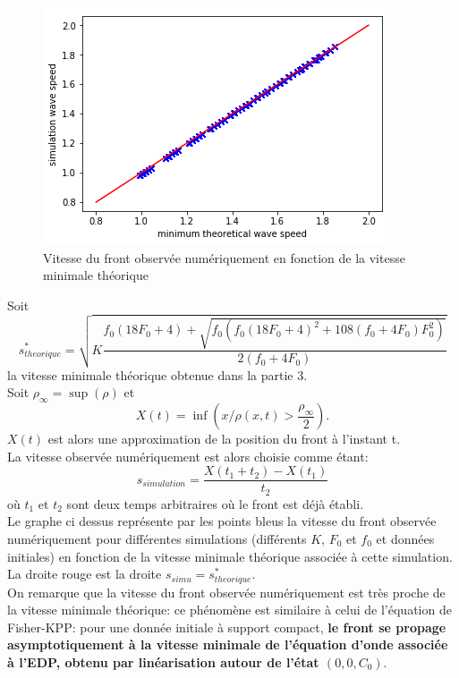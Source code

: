 \documentclass[11pt]{article}
\begin{document}
\newpage
 
\begin{figure}[hbt!]
\centering
\includegraphics[width=.7\textwidth]{Images/stheoriquevssimulations.png}
\caption{Vitesse du front observée numériquement en fonction de la vitesse minimale théorique}
\end{figure}
Soit \begin{equation}
s^*_{theorique} =\sqrt{K\frac{f_0(18F_0+4)+\sqrt{f_0(f_0(18F_0+4)^2+108(f_0+4F_0)F_0^2)}}{2(f_0+4F_0)}}\end{equation} la vitesse minimale théorique obtenue dans la partie 3.\\
Soit $\rho_\infty =\sup(\rho)$ et \begin{equation}
	 X(t)=\inf(x / \rho(x,t)> \frac{\rho_\infty}{2}). 
\end{equation}
$X(t)$ est alors une approximation de la position du front à l'instant t.\\
 La vitesse observée numériquement est alors choisie comme étant: \begin{equation}
	s_{simulation}=\frac{X(t_1+t_2)-X(t_1)}{t_2}
\end{equation}	où $t_1$ et $t_2$ sont deux temps arbitraires où le front est déjà établi.\\
Le graphe ci dessus représente par les points bleus la vitesse du front observée numériquement pour différentes simulations (différents $K$, $F_0$ et $f_0$ et données initiales) en fonction de la vitesse minimale théorique associée à cette simulation. La droite rouge est la droite $s_{simu} = s^*_{theorique}$.\\
On remarque que la vitesse du front observée numériquement est très proche de la vitesse minimale théorique: ce phénomène est similaire à celui de l'équation de Fisher-KPP: pour une donnée initiale à support compact, \textbf{le front se propage asymptotiquement à la vitesse minimale de l'équation d'onde associée à l'EDP, obtenu par linéarisation autour de l'état $(0,0,C_0)$}.
\end{document}
